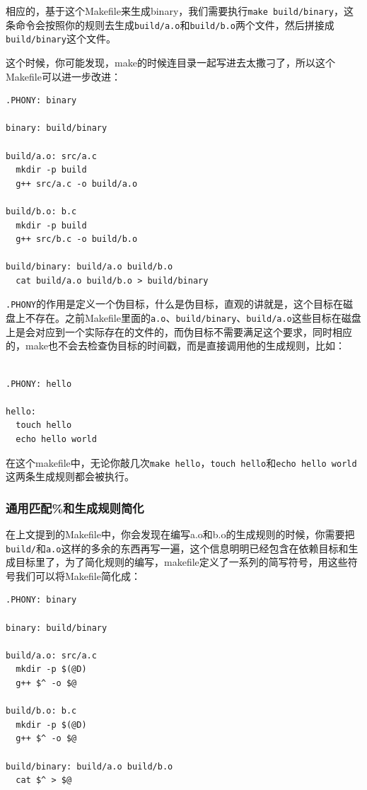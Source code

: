 \documentclass[lang=cn,11pt,a4paper]{elegantpaper}
\begin{document}
相应的，基于这个Makefile来生成binary，我们需要执行\lstinline!make build/binary!，这条命令会按照你的规则去生成\lstinline!build/a.o!和\lstinline!build/b.o!两个文件，然后拼接成\lstinline!build/binary!这个文件。

这个时候，你可能发现，make的时候连目录一起写进去太撒刁了，所以这个Makefile可以进一步改进：

\begin{lstlisting}
.PHONY: binary

binary: build/binary

build/a.o: src/a.c
  mkdir -p build
  g++ src/a.c -o build/a.o

build/b.o: b.c
  mkdir -p build
  g++ src/b.c -o build/b.o

build/binary: build/a.o build/b.o
  cat build/a.o build/b.o > build/binary
\end{lstlisting}

\lstinline!.PHONY!的作用是定义一个伪目标，什么是伪目标，直观的讲就是，这个目标在磁盘上不存在。之前Makefile里面的\lstinline!a.o!、\lstinline!build/binary!、\lstinline!build/a.o!这些目标在磁盘上是会对应到一个实际存在的文件的，而伪目标不需要满足这个要求，同时相应的，make也不会去检查伪目标的时间戳，而是直接调用他的生成规则，比如：

\begin{lstlisting}

.PHONY: hello

hello:
  touch hello
  echo hello world
\end{lstlisting}

在这个makefile中，无论你敲几次\lstinline!make hello!，\lstinline!touch hello!和\lstinline!echo hello world!这两条生成规则都会被执行。

\subsubsection{通用匹配\%和生成规则简化}

在上文提到的Makefile中，你会发现在编写a.o和b.o的生成规则的时候，你需要把\lstinline!build/!和\lstinline!a.o!这样的多余的东西再写一遍，这个信息明明已经包含在依赖目标和生成目标里了，为了简化规则的编写，makefile定义了一系列的简写符号，用这些符号我们可以将Makefile简化成：

\begin{lstlisting}
.PHONY: binary

binary: build/binary

build/a.o: src/a.c
  mkdir -p $(@D)
  g++ $^ -o $@

build/b.o: b.c
  mkdir -p $(@D)
  g++ $^ -o $@

build/binary: build/a.o build/b.o
  cat $^ > $@
\end{lstlisting}
\end{document}
